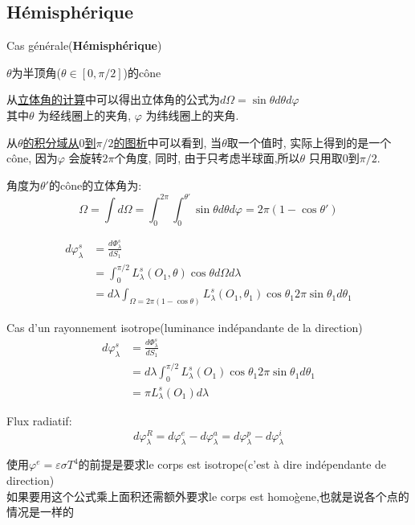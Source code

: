 \documentclass{article}
\begin{document}
\subsection{H\'emisph\'erique}
Cas g\'en\'erale(\textbf{H\'emisph\'erique})

$\theta$为半顶角($\theta \in [0,\pi/2]$)的c\^one

从\href{http://i.imgbox.com/90aLTQdS.png}{立体角的计算}中可以得出立体角的公式为$d\Omega = \sin \theta d\theta d\varphi $\\
其中$\theta$ 为经线圈上的夹角, $\varphi$ 为纬线圈上的夹角.

从\href{http://i.imgbox.com/1adl5otW.png}{$\theta$的积分域从$0$到$\pi/2$的图析}中可以看到, 当$\theta$取一个值时, 实际上得到的是一个c\^one, 因为$\varphi$ 会旋转$2\pi$个角度, 同时, 由于只考虑半球面,所以$\theta$ 只用取$0$到$\pi/2$.

角度为$\theta'$的c\^one的立体角为:
$$\Omega = \int d\Omega= \int_0^{2\pi} \int_0^{\theta'} \sin \theta d\theta d\varphi = 2\pi(1-\cos \theta')$$

\begin{equation}
	\begin{split}
d\varphi_{\lambda }^s  & = \frac{d \Phi_{\lambda }^s}{dS_1} \\
 & =  \int_{0}^{\pi/2}L_{\lambda }^s(O_1,\theta)\cos \theta d\Omega d \lambda \\
 & = d \lambda \int_{\Omega = 2\pi(1-\cos \theta)} L_{\lambda }^s(O_1,\theta_1)\cos \theta_1 2\pi \sin\theta_1 d\theta_1
	\end{split}
\end{equation}

Cas d'un rayonnement isotrope(luminance ind\'epandante de la direction)
\begin{equation}
	\begin{split}
d\varphi_{\lambda }^s &= \frac{d \Phi_{\lambda }^s}{dS_1}\\
&=d \lambda \int_{0}^{\pi/2}L_{\lambda }^s(O_1)\cos \theta_1 2\pi \sin\theta_1 d\theta_1 \\
&= \pi L_{\lambda }^s(O_1)d\lambda
	\end{split}
\end{equation}

Flux radiatif:
$$d\varphi_{\lambda }^R =d\varphi_{\lambda }^e - d\varphi_{\lambda }^a = d\varphi_{\lambda }^p - d\varphi_{\lambda }^i$$

使用$\varphi^e=\varepsilon \sigma T^4$的前提是要求le corps est isotrope(c'est \`a dire ind\'ependante de direction)\\
如果要用这个公式乘上面积还需额外要求le corps est homo\`gene,也就是说各个点的情况是一样的
\end{document}
